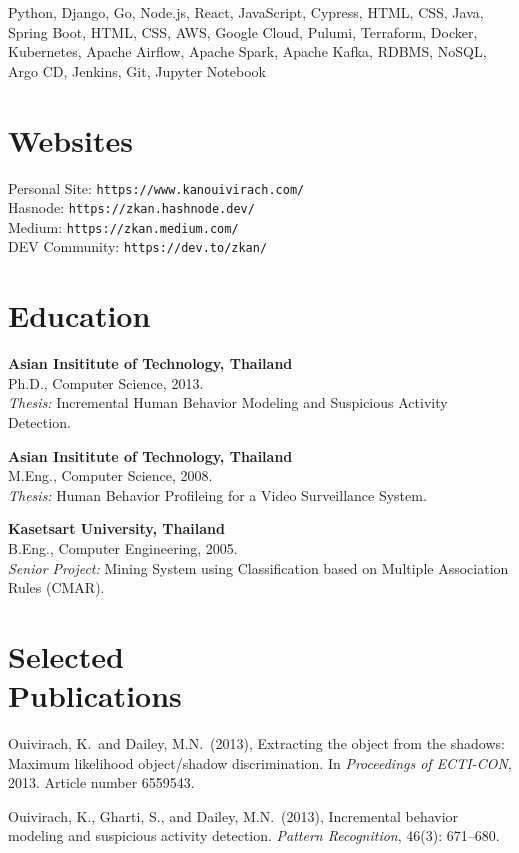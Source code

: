 \documentclass[margin, 10pt]{res}
\begin{document}
\begin{resume}
Python, Django, Go, Node.js, React, JavaScript, Cypress, HTML, CSS,
Java, Spring Boot, HTML, CSS, AWS, Google Cloud, Pulumi, Terraform,
Docker, Kubernetes, Apache Airflow, Apache Spark, Apache Kafka, RDBMS, NoSQL,
Argo CD, Jenkins, Git, Jupyter Notebook

\section{Websites}

Personal Site: {\tt https://www.kanouivirach.com/}\\
Hasnode: {\tt https://zkan.hashnode.dev/}\\
Medium: {\tt https://zkan.medium.com/}\\
DEV Community: {\tt https://dev.to/zkan/}\\

\section{Education}

{\bf Asian Insititute of Technology, Thailand} \\
Ph.D., Computer Science, 2013. \\
{\it Thesis:} Incremental Human Behavior Modeling and Suspicious Activity
Detection.

{\bf Asian Insititute of Technology, Thailand} \\
M.Eng., Computer Science, 2008. \\
{\it Thesis:} Human Behavior Profileing for a Video Surveillance System.

{\bf Kasetsart University, Thailand} \\
B.Eng., Computer Engineering, 2005. \\
{\it Senior Project:} Mining System using Classification based on Multiple
Association Rules (CMAR).

\section{Selected \\ Publications}

Ouivirach, K.\ and Dailey, M.N.\ (2013), Extracting the object from the shadows:
Maximum likelihood object/shadow discrimination. In {\it Proceedings of
ECTI-CON}, 2013. Article number 6559543.

Ouivirach, K., Gharti, S., and Dailey, M.N.\ (2013), Incremental behavior
modeling  and suspicious activity detection. {\it Pattern Recognition}, 46(3):
671--680.


\end{resume}
\end{document}

